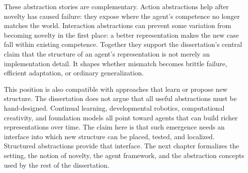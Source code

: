 These abstraction stories are complementary.
Action abstractions help after novelty has caused failure: they expose where the agent's competence no longer matches the world.
Interaction abstractions can prevent some variation from becoming novelty in the first place: a better representation makes the new case fall within existing competence.
Together they support the dissertation's central claim that the structure of an agent's representation is not merely an implementation detail.
It shapes whether mismatch becomes brittle failure, efficient adaptation, or ordinary generalization.

This position is also compatible with approaches that learn or propose new structure.
The dissertation does not argue that all useful abstractions must be hand-designed.
Continual learning, developmental robotics, computational creativity, and foundation models all point toward agents that can build richer representations over time.
The claim here is that such emergence needs an interface into which new structure can be placed, tested, and localized.
Structured abstractions provide that interface.
The next chapter formalizes the setting, the notion of novelty, the agent framework, and the abstraction concepts used by the rest of the dissertation.
